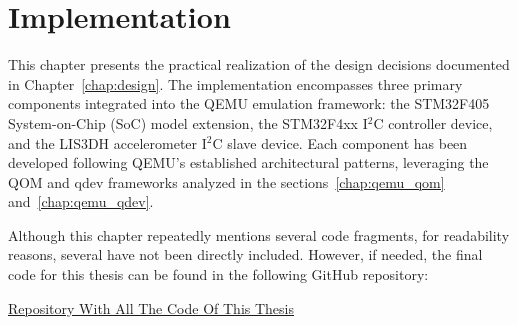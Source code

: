 \chapter{Implementation}
\label{chap:implementation}

This chapter presents the practical realization of the design decisions documented in Chapter~\ref{chap:design}. The implementation encompasses three primary components integrated into the QEMU emulation framework: the STM32F405 System-on-Chip (SoC) model extension, the STM32F4xx I$^2$C controller device, and the LIS3DH accelerometer I$^2$C slave device. Each component has been developed following QEMU's established architectural patterns, leveraging the QOM and qdev frameworks analyzed in the sections~\ref{chap:qemu_qom} and~\ref{chap:qemu_qdev}.

Although this chapter repeatedly mentions several code fragments, for readability reasons, several have not been directly included. However, if needed, the final code for this thesis can be found in the following GitHub repository:

\href{https://github.com/AntoLotti/TFM}{Repository With All The Code Of This Thesis}



\newpage


\newpage


\newpage


\newpage


\newpage
